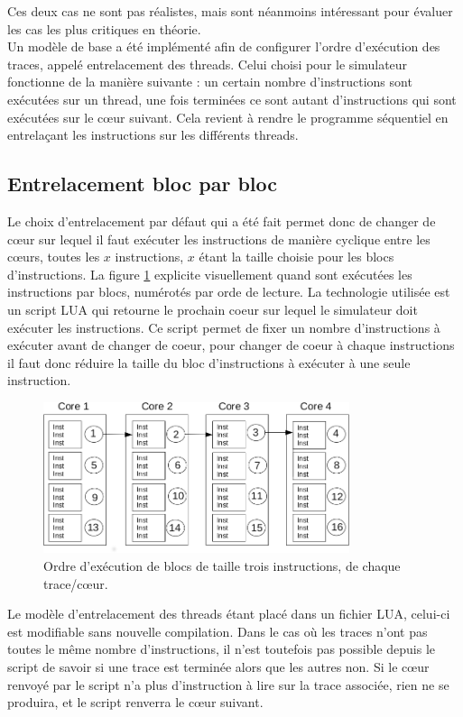 Ces deux cas ne sont pas réalistes, mais sont néanmoins intéressant pour évaluer les cas les plus critiques en théorie.\\


Un modèle de base a été implémenté afin de configurer l'ordre d'exécution des traces, appelé entrelacement des threads. Celui choisi pour le simulateur fonctionne de la manière suivante : un certain nombre d'instructions sont exécutées sur un thread, une fois terminées ce sont autant d'instructions qui sont exécutées sur le c\oe ur suivant. Cela revient à rendre le programme  séquentiel en entrelaçant les instructions sur les différents threads.

\subsection{Entrelacement bloc par bloc}

Le choix d'entrelacement par défaut qui a été fait permet donc de changer de c\oe ur sur lequel il faut exécuter les instructions de manière cyclique entre les c\oe urs, toutes les $x$ instructions, $x$ étant la taille choisie pour les blocs d'instructions. La figure \ref{img:entrelacement} explicite visuellement quand sont exécutées les instructions par blocs, numérotés par orde de lecture. La technologie utilisée est un script LUA qui retourne le prochain coeur sur lequel le simulateur doit exécuter les instructions. Ce script permet de fixer un nombre d'instructions à exécuter avant de changer de coeur, pour changer de coeur à chaque instructions il faut donc réduire la taille du bloc d'instructions à exécuter à une seule instruction.\\

\begin{figure}[!h]
\begin{center}
   \includegraphics[width=0.8\textwidth]{images/entrelacement.png}
   \caption{\label{img:entrelacement} Ordre d'exécution de blocs de taille trois instructions, de chaque trace/c\oe ur.}
\end{center}
\end{figure}



Le modèle d'entrelacement des threads étant placé dans un fichier LUA, celui-ci est modifiable sans nouvelle compilation. Dans le cas où les traces n'ont pas toutes le même nombre d'instructions, il n'est toutefois pas possible depuis le script de savoir si une trace est terminée alors que les autres non. Si le c\oe ur renvoyé par le script n'a plus d'instruction à lire sur la trace associée, rien ne se produira, et le script renverra le c\oe ur suivant. 

